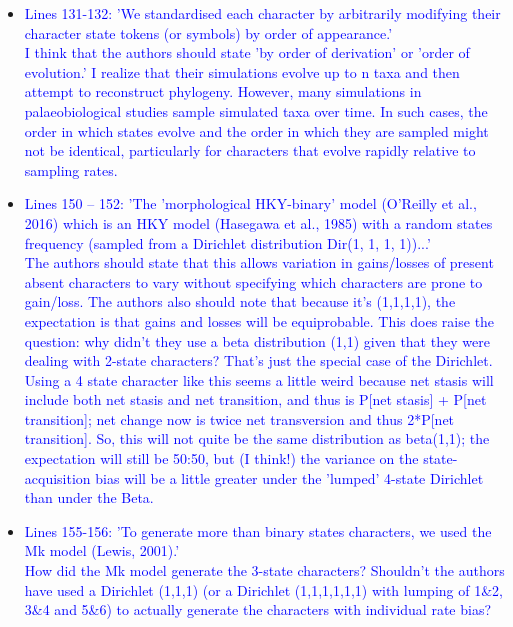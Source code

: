 \documentclass[12pt,letterpaper]{article}
\begin{document}
\begin{itemize}
\item{\textcolor{blue}{Lines 131-132: 'We standardised each character by arbitrarily modifying their character state tokens (or symbols) by order of appearance.'
\\
I think that the authors should state 'by order of derivation' or 'order of evolution.' I realize that their simulations evolve up to n taxa and then attempt to reconstruct phylogeny. However, many simulations in palaeobiological studies sample simulated taxa over time. In such cases, the order in which states evolve and the order in which they are sampled might not be identical, particularly for characters that evolve rapidly relative to sampling rates.}}


\item{\textcolor{blue}{Lines 150 – 152: 'The 'morphological HKY-binary' model (O’Reilly et al.,
2016) which is an HKY model (Hasegawa et al., 1985) with a random states frequency (sampled from a Dirichlet distribution Dir(1, 1, 1, 1))...'
\\
The authors should state that this allows variation in gains/losses of present absent characters to vary without specifying which characters are prone to gain/loss. The authors also should note that because it’s (1,1,1,1), the expectation is that gains and losses will be equiprobable. This does raise the question: why didn’t they use a beta distribution (1,1) given that they were dealing with 2-state characters? That’s just the special case of the Dirichlet. Using a 4 state character like this seems a little weird because net stasis will include both net stasis and net transition, and thus is P[net stasis] + P[net transition]; net change now is twice net transversion and thus 2*P[net transition]. So, this will not quite be the same distribution as beta(1,1); the expectation will still be 50:50, but (I think!) the variance on the state-acquisition bias will be a little greater under the 'lumped' 4-state Dirichlet than under the Beta.}}

\item{\textcolor{blue}{Lines 155-156: 'To generate more than binary states characters, we used the Mk model (Lewis, 2001).'
\\
How did the Mk model generate the 3-state characters? Shouldn’t the authors have used a Dirichlet (1,1,1) (or a Dirichlet (1,1,1,1,1,1) with lumping of 1\&2, 3\&4 and 5\&6) to actually generate the characters with individual rate bias?}}


\end{itemize}
\end{document}
